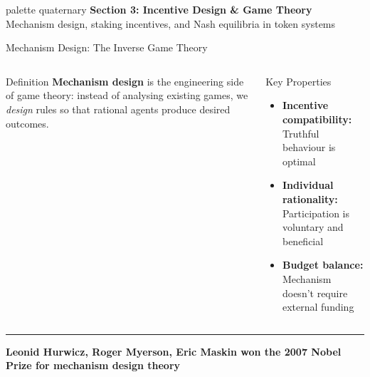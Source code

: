 \documentclass[8pt,aspectratio=169]{beamer}
\newcommand{\bottomnote}[1]{\vfill\vspace{-2mm}\textcolor{mllavender2}{\rule{\textwidth}{0.4pt}}\vspace{1mm}\footnotesize\textbf{#1}}
\begin{document}
\begin{frame}{}
\begin{beamercolorbox}[sep=12pt,center,rounded=true,shadow=true]{palette quaternary}
{\Large\bfseries Section 3: Incentive Design \& Game Theory}\\[6pt]
{\normalsize Mechanism design, staking incentives, and Nash equilibria in token systems}
\end{beamercolorbox}
\end{frame}

\begin{frame}{Mechanism Design: The Inverse Game Theory}
\begin{columns}[T]
\begin{block}{Definition}
\footnotesize
\textbf{Mechanism design} is the engineering side of game theory: instead of analysing existing games, we \textit{design} rules so that rational agents produce desired outcomes.
\end{block}
\vspace{2mm}
\begin{block}{Key Properties}
\footnotesize
\begin{itemize}
  \item \textbf{Incentive compatibility:} Truthful behaviour is optimal
  \item \textbf{Individual rationality:} Participation is voluntary and beneficial
  \item \textbf{Budget balance:} Mechanism doesn't require external funding
\end{itemize}
\end{block}

\end{columns}
\bottomnote{Leonid Hurwicz, Roger Myerson, Eric Maskin won the 2007 Nobel Prize for mechanism design theory}
\end{frame}
\end{document}
